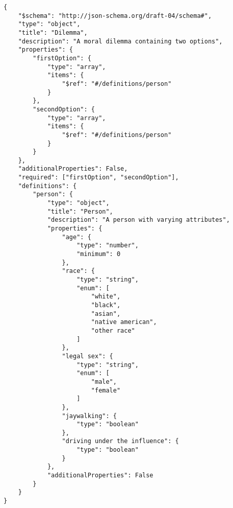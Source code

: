 \begin{verbatim}
{
    "$schema": "http://json-schema.org/draft-04/schema#",
    "type": "object",
    "title": "Dilemma",
    "description": "A moral dilemma containing two options",
    "properties": {
        "firstOption": {
            "type": "array",
            "items": {
                "$ref": "#/definitions/person"
            }
        },
        "secondOption": {
            "type": "array",
            "items": {
                "$ref": "#/definitions/person"
            }
        }
    },
    "additionalProperties": False,
    "required": ["firstOption", "secondOption"],
    "definitions": {
        "person": {
            "type": "object",
            "title": "Person",
            "description": "A person with varying attributes",
            "properties": {
                "age": {
                    "type": "number",
                    "minimum": 0
                },
                "race": {
                    "type": "string",
                    "enum": [
                        "white",
                        "black",
                        "asian",
                        "native american",
                        "other race"
                    ]
                },
                "legal sex": {
                    "type": "string",
                    "enum": [
                        "male",
                        "female"
                    ]
                },
                "jaywalking": {
                    "type": "boolean"
                },
                "driving under the influence": {
                    "type": "boolean"
                }
            },
            "additionalProperties": False
        }
    }
}
\end{verbatim}